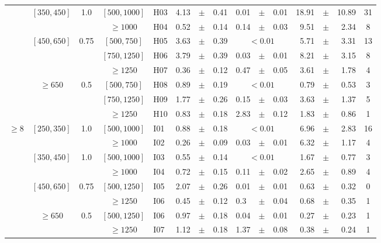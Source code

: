 \begin{table*}[!ht]
{\begin{tabular}{c|c|c|c|l|rrr|lll|rrr|c}
\cline{2-15}
&$[350,450]$ & 1.0
&$[500,1000]$
 & H03
 & 4.13&$\pm$&0.41 & 0.01&$\pm$&0.01 & 18.91&$\pm$&10.89
 & 31 \\
\cline{4-15}
& &
&$\geq1000$
 & H04
 & 0.52&$\pm$&0.14 & 0.14&$\pm$&0.03 & 9.51&$\pm$&2.34
 & 8 \\
\cline{2-15}
&$[450,650]$ & 0.75
&$[500,750]$
 & H05
& 3.63&$\pm$&0.39 & \multicolumn{3}{c|}{$<0.01$}& 5.71&$\pm$&3.31
 & 13 \\
\cline{4-15}
& &
&$[750,1250]$
 & H06
 & 3.79&$\pm$&0.39 & 0.03&$\pm$&0.01 & 8.21&$\pm$&3.15
 & 8 \\
\cline{4-15}
&&
&$\geq1250$
 &  H07
 & 0.36&$\pm$&0.12 & 0.47&$\pm$&0.05 & 3.61&$\pm$&1.78
 & 4 \\
\cline{2-15}
&$\geq650$ & 0.5
&$[500,750]$
 & H08
& 0.89&$\pm$&0.19 & \multicolumn{3}{c|}{$<0.01$}& 0.79&$\pm$&0.53
 & 3 \\
\cline{4-15}
& &
&$[750,1250]$
 & H09
 & 1.77&$\pm$&0.26 & 0.15&$\pm$&0.03 & 3.63&$\pm$&1.37
 & 5 \\
\cline{4-15}
&&
&$\geq1250$
 & H10
 & 0.83&$\pm$&0.18 & 2.83&$\pm$&0.12 & 1.83&$\pm$&0.86
 & 1 \\
\cline{2-15}
\hline
\hline
$\geq8$
&$[250,350]$ & 1.0
&$[500,1000]$
 & I01
  & 0.88&$\pm$&0.18 & \multicolumn{3}{c|}{$<0.01$}& 6.96&$\pm$&2.83
 & 16 \\
\cline{4-15}
& &
&$\geq1000$
 & I02
 & 0.26&$\pm$&0.09 & 0.03&$\pm$&0.01 & 6.32&$\pm$&1.17
 & 4 \\
\cline{2-15}
&$[350,450]$ & 1.0
&$[500,1000]$
 & I03
& 0.55&$\pm$&0.14 & \multicolumn{3}{c|}{$<0.01$}& 1.67&$\pm$&0.77
 & 3 \\
\cline{4-15}
& &
&$\geq1000$
 & I04
 & 0.72&$\pm$&0.15 & 0.11&$\pm$&0.02 & 2.65&$\pm$&0.89
 & 4 \\
\cline{2-15}
&$[450,650]$ &0.75
&$[500,1250]$
 & I05
 & 2.07&$\pm$&0.26 & 0.01&$\pm$&0.01 & 0.63&$\pm$&0.32
 & 0 \\
\cline{4-15}
&&
&$\geq1250$
 & I06
 & 0.45&$\pm$&0.12 & 0.3&$\pm$&0.04 & 0.68&$\pm$&0.35
 & 1 \\
\cline{2-15}
&$\geq650$ & 0.5
&$[500,1250]$
 & I06
 & 0.97&$\pm$&0.18 & 0.04&$\pm$&0.01 & 0.27&$\pm$&0.23
 & 1 \\
\cline{4-15}
&&
&$\geq1250$
 & I07
 & 1.12&$\pm$&0.18 & 1.37&$\pm$&0.08 & 0.38&$\pm$&0.24
 & 1 \\
\cline{2-15}\hline
\end{tabular}}
\end{table*}